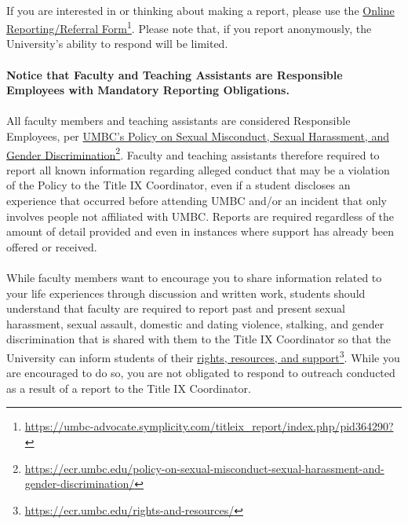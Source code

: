 \documentclass[letter,10pt]{article}
\begin{document}
\paragraph{}If you are interested in or thinking about making a report, please use the \href{https://umbc-advocate.symplicity.com/titleix_report/index.php/pid364290?}{Online Reporting/Referral Form}\footnote{\url{https://umbc-advocate.symplicity.com/titleix_report/index.php/pid364290?}}. Please note that, if you report anonymously, the University’s ability to respond will be limited.

\paragraph{}\textbf{Notice that Faculty and Teaching Assistants are Responsible Employees with Mandatory Reporting Obligations.}

\paragraph{}All faculty members and teaching assistants are considered Responsible Employees, per \href{https://ecr.umbc.edu/policy-on-sexual-misconduct-sexual-harassment-and-gender-discrimination/}{UMBC’s Policy on Sexual Misconduct, Sexual Harassment, and Gender Discrimination}\footnote{\url{https://ecr.umbc.edu/policy-on-sexual-misconduct-sexual-harassment-and-gender-discrimination/}}. Faculty and teaching assistants therefore required to report all known information regarding alleged conduct that may be a violation of the Policy to the Title IX Coordinator, even if a student discloses an experience that occurred before attending UMBC and/or an incident that only involves people not affiliated with UMBC.  Reports are required regardless of the amount of detail provided and even in instances where support has already been offered or received.

\paragraph{}While faculty members want to encourage you to share information related to your life experiences through discussion and written work, students should understand that faculty are required to report past and present sexual harassment, sexual assault, domestic and dating violence, stalking, and gender discrimination that is shared with them to the Title IX Coordinator so that the University can inform students of their \href{https://ecr.umbc.edu/rights-and-resources/}{rights, resources, and support}\footnote{\url{https://ecr.umbc.edu/rights-and-resources/}}.  While you are encouraged to do so, you are not obligated to respond to outreach conducted as a result of a report to the Title IX Coordinator.
\end{document}
